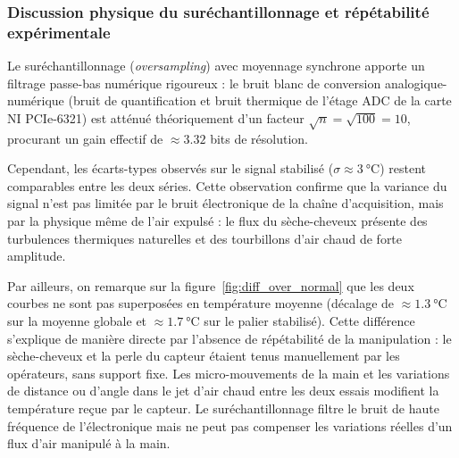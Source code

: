 \subsubsection*{Discussion physique du suréchantillonnage et répétabilité expérimentale}
Le suréchantillonnage (\textit{oversampling}) avec moyennage synchrone apporte un filtrage passe-bas numérique rigoureux : le bruit blanc de conversion analogique-numérique (bruit de quantification et bruit thermique de l'étage ADC de la carte NI PCIe-6321) est atténué théoriquement d'un facteur $\sqrt{n} = \sqrt{100} = 10$, procurant un gain effectif de $\approx 3.32$ bits de résolution.

Cependant, les écarts-types observés sur le signal stabilisé ($\sigma \approx \qty{3}{\degreeCelsius}$) restent comparables entre les deux séries. Cette observation confirme que la variance du signal n'est pas limitée par le bruit électronique de la chaîne d'acquisition, mais par la physique même de l'air expulsé : le flux du sèche-cheveux présente des turbulences thermiques naturelles et des tourbillons d'air chaud de forte amplitude.

Par ailleurs, on remarque sur la figure~\ref{fig:diff_over_normal} que les deux courbes ne sont pas superposées en température moyenne (décalage de $\approx \qty{1.3}{\degreeCelsius}$ sur la moyenne globale et $\approx \qty{1.7}{\degreeCelsius}$ sur le palier stabilisé). Cette différence s'explique de manière directe par l'absence de répétabilité de la manipulation : le sèche-cheveux et la perle du capteur étaient tenus manuellement par les opérateurs, sans support fixe. Les micro-mouvements de la main et les variations de distance ou d'angle dans le jet d'air chaud entre les deux essais modifient la température reçue par le capteur. Le suréchantillonnage filtre le bruit de haute fréquence de l'électronique mais ne peut pas compenser les variations réelles d'un flux d'air manipulé à la main.
